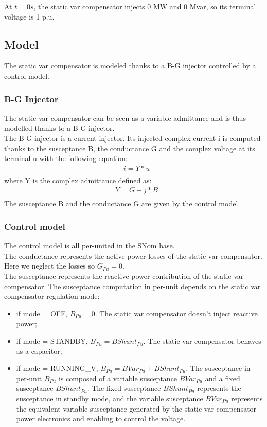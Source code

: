 \documentclass[a4paper, 12pt]{report}
\begin{document}
At $t=0s$, the static var compensator injects 0 MW and 0 Mvar, so its terminal voltage is 1 p.u.

\subsection{Model}

The static var compensator is modeled thanks to a B-G injector controlled by a control model.

\subsubsection{B-G Injector}
The static var compensator can be seen as a variable admittance and is thus modelled thanks to a B-G injector.\\

The B-G injector is a current injector. Its injected complex current i is computed thanks to the susceptance B, the conductance G and the complex voltage at its terminal u with the following equation:
\[
\begin{aligned}
& i = Y*u \\
\end{aligned}
\]
where Y is the complex admittance defined as:
\[
\begin{aligned}
& Y = G + j*B \\
\end{aligned}
\]
The susceptance B and the conductance G are given by the control model.

\subsubsection{Control model}

The control model is all per-united in the SNom base.\\

The conductance represents the active power losses of the static var compensator. Here we neglect the losses so $G_{Pu} = 0$.\\

The susceptance represents the reactive power contribution of the static var compensator. The susceptance computation in per-unit depends on the static var compensator regulation mode:

\begin{itemize}
\item if mode = OFF, $B_{Pu} = 0$. The static var compensator doesn't inject reactive power;
\item if mode = STANDBY, $B_{Pu} = BShunt_{Pu}$.
The static var compensator behaves as a  capacitor;
\item if mode = RUNNING\_V, $B_{Pu} = BVar_{Pu} + BShunt_{Pu}$. The susceptance in per-unit $B_{Pu}$ is composed of a variable susceptance $BVar_{Pu}$ and a fixed susceptance $BShunt_{Pu}$. The fixed susceptance $BShunt_{Pu}$ represents the susceptance in standby mode, and the variable susceptance $BVar_{Pu}$ represents the equivalent variable susceptance generated by the static var compensator power electronics and enabling to control the voltage.
\end{itemize}
\end{document}
